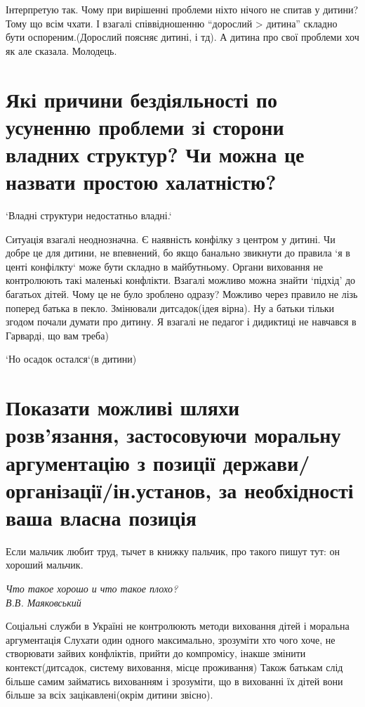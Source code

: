 \documentclass[a4paper,12pt]{article}
\begin{document}
    Інтерпретую так. Чому при вирішенні проблеми ніхто нічого не спитав у дитини? Тому що всім чхати.
    І взагалі співвідношенню ``дорослий > дитина'' складно бути оспореним.(Дорослий поясняє дитині, і тд).
    А дитина про свої проблеми хоч як але сказала. Молодець.

    \section{Які причини бездіяльності по усуненню проблеми зі сторони владних структур? Чи можна це назвати простою халатністю?}
    `Владні структури недостатньо владні.`

    Ситуація взагалі неоднозначна. Є наявність конфілку з центром у дитині. Чи добре це для дитини, не впевнений, бо
    якщо банально звикнути до правила `я в центі конфілкту` може бути складно в майбутньому.
    Органи виховання не контролюють такі маленькі конфлікти. Взагалі можливо можна знайти `підхід' до багатьох дітей.
    Чому це не було зроблено одразу? Можливо через правило не лізь поперед батька в пекло. Змінювали дитсадок(ідея вірна).
    Ну а батьки тільки згодом почали думати про дитину. Я взагалі не педагог і дидиктиці не навчався в Гарварді, що вам треба)

    `Но осадок остался`(в дитини)

    \section{Показати можливі шляхи розв’язання, застосовуючи моральну аргументацію з позиції держави/організації/ін.установ, за необхідності ваша власна позиція}
    \epigraph{Если мальчик любит труд, тычет в книжку пальчик, про такого пишут тут: он хороший мальчик.}{\textit{Что такое хорошо и что такое плохо? \\ В.В. Маяковський}}
    Соціальні служби в Україні не контролюють методи виховання дітей і моральна аргументація
    Слухати один одного максимально, зрозуміти хто чого хоче, не створювати зайвих конфліктів, прийти до компромісу,
    інакше змінити контекст(дитсадок, систему виховання, місце проживання)
    Також батькам слід більше самим займатись вихованням і зрозуміти, що в вихованні їх дітей вони більше за всіх
    зацікавлені(окрім дитини звісно).

    \pagestyle{empty}
\end{document}
